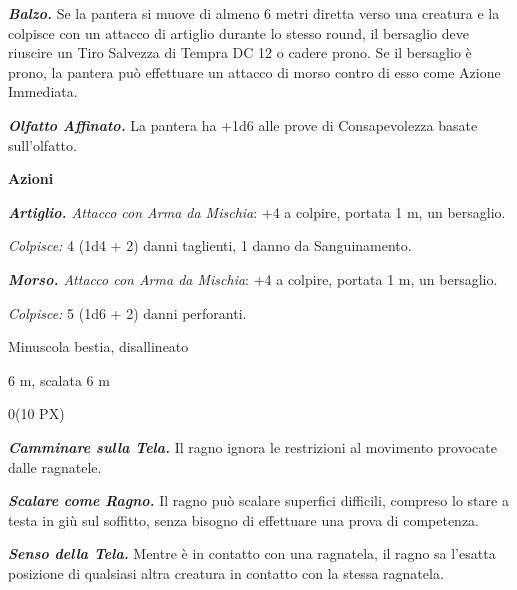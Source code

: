 \begin{multicols}{2}
{\emph{\textbf{Balzo.}} Se la pantera si muove di almeno 6 metri diretta verso una creatura e la colpisce con un attacco di artiglio durante lo stesso round, il bersaglio deve riuscire un Tiro Salvezza di Tempra DC 12 o cadere prono. Se il bersaglio è prono, la pantera può effettuare un attacco di morso contro di esso come Azione Immediata.

\emph{\textbf{Olfatto Affinato.}} La pantera ha +1d6 alle prove di Consapevolezza basate sull'olfatto.

\textbf{Azioni}

\emph{\textbf{Artiglio.} Attacco con Arma da Mischia}: +4 a colpire, portata 1 m, un bersaglio.

\emph{Colpisce:} 4 (1d4 + 2) danni taglienti, 1 danno da Sanguinamento.

\emph{\textbf{Morso.} Attacco con Arma da Mischia}: +4 a colpire, portata 1 m, un bersaglio.

\emph{Colpisce:} 5 (1d6 + 2) danni perforanti.

\begin{description}[noitemsep, topsep=0pt, parsep=0pt, partopsep=0pt, itemsep=1pt, leftmargin=2.35cm,  labelwidth=2.2cm, itemindent=0cm, listparindent=0pt] %
\setlength{\baselineskip}{10pt}
\item[\textbf{Taglia/Tipo}] Minuscola bestia, disallineato
\item[\textbf{Caratt.}] 
\item[\textbf{Punti Ferita}] 
\item[\textbf{Tiri Salvez.}] 
\item[\textbf{Movimento}] 6 m, scalata 6 m
\item[\textbf{Sfida}] 0(10 PX)
\end{description}
\smallskip

\emph{\textbf{Camminare sulla Tela.}} Il ragno ignora le restrizioni al movimento provocate dalle ragnatele.

\emph{\textbf{Scalare come Ragno.}} Il ragno può scalare superfici difficili, compreso lo stare a testa in giù sul soffitto, senza bisogno di effettuare una prova di competenza.

\emph{\textbf{Senso della Tela.}} Mentre è in contatto con una ragnatela, il ragno sa l'esatta posizione di qualsiasi altra creatura in contatto con la stessa ragnatela.

}
\end{multicols}
